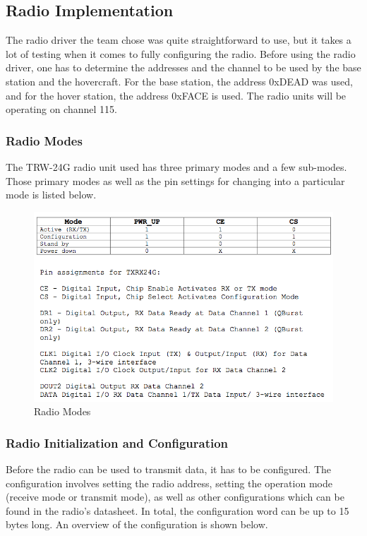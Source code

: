 \subsection{Radio Implementation}
The radio driver the team chose was quite straightforward to use, but it takes a lot of testing when it comes to fully configuring the radio. Before using the radio driver, one has to determine the addresses and the channel to be used by the base station and the hovercraft. For the base station, the address 0xDEAD was used, and for the hover station, the address 0xFACE is used. The radio units will be operating on channel 115.

\subsubsection{Radio Modes}
The TRW-24G radio unit used has three primary modes and a few sub-modes. Those primary modes as well as the pin settings for changing into a particular mode is listed below.

\begin{figure}[tpb]
  \begin{center}
    \includegraphics[width=125mm]{imageSources/radioModes.png}
  \end{center}
  \caption{Radio Modes} 
  \label{radioModes}
\end{figure}

\subsubsection{Radio Initialization and Configuration}
Before the radio can be used to transmit data, it has to be configured. The configuration involves setting the radio address, setting the operation mode (receive mode or transmit mode), as well as other configurations which can be found in the radio's datasheet. In total, the configuration word can be up to 15 bytes long. An overview of the configuration is shown below.

